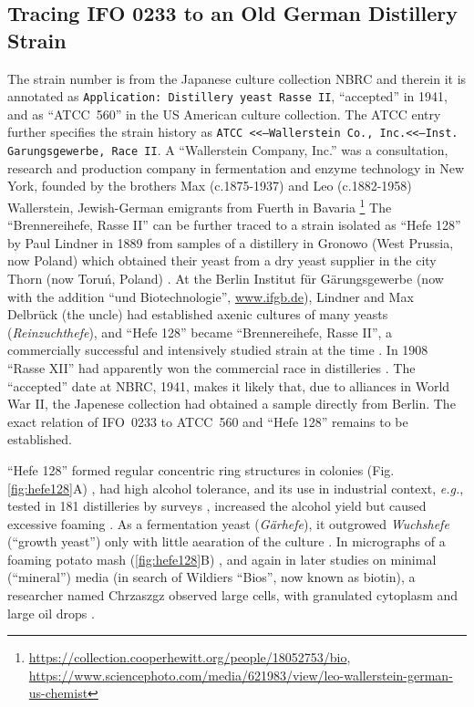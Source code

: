 \documentclass[11pt,a4paper,english]{article}
\newcommand{\ifo}{IFO~0233}
\newcommand{\eg}[0]{\textit{e.g.}}
\let\cite\citep
\begin{document}
\subsection{Tracing IFO 0233 to an Old German Distillery Strain}
The strain number is from the Japanese
culture collection NBRC and therein it is annotated as \texttt{Application:
  Distillery yeast Rasse II}, ``accepted'' in 1941, and as ``ATCC~560'' in
the US American culture collection. The ATCC entry further specifies
the strain history as \texttt{ATCC <<--Wallerstein Co.,
  Inc.<<--Inst. Garungsgewerbe, Race II}.  A ``Wallerstein Company,
Inc.''  was a consultation, research and production company in
fermentation and enzyme technology in New York, founded by the
brothers Max (c.1875-1937) and Leo (c.1882-1958) Wallerstein,
Jewish-German emigrants from Fuerth in
Bavaria \footnote{\url{https://collection.cooperhewitt.org/people/18052753/bio},\\ \url{https://www.sciencephoto.com/media/621983/view/leo-wallerstein-german-us-chemist}}
The ``Brennereihefe, Rasse II'' can be further traced to a strain
isolated as ``Hefe 128'' by Paul Lindner in 1889 from samples of a
distillery in Gronowo (West Prussia, now Poland) which obtained their
yeast from a dry yeast supplier in the city Thorn (now Toru\'n,
Poland) \cite{Lindner1895}. At the Berlin Institut f\"ur
G\"arungsgewerbe (now with the addition ``und Biotechnologie'',
\url{www.ifgb.de}), Lindner and Max Delbr\"uck (the uncle) had
established axenic cultures of many yeasts (\textit{Reinzuchthefe}),
and ``Hefe 128'' became ``Brennereihefe, Rasse II'', a commercially
successful and intensively studied strain at the time
\cite{Lindner1895, Lindner1919}. In 1908 ``Rasse XII'' had apparently
won the commercial race in distilleries \cite{Kohl1908}.  The
``accepted'' date at NBRC, 1941, makes it likely that, due to
alliances in World War II, the Japenese collection had obtained a
sample directly from Berlin. The exact relation of \ifo{} to ATCC~560
and ``Hefe 128'' remains to be established.

``Hefe 128'' formed regular concentric ring structures in colonies
(Fig. \ref{fig:hefe128}A) \cite{Lindner1895}, had high alcohol tolerance, and
its use in industrial context, \eg{}, tested in 181 distilleries by
surveys \cite{Dingler1894}, increased the alcohol yield but caused
excessive foaming \cite{Behrend1900}. As a fermentation yeast
(\textit{G\"arhefe}), it outgrowed \textit{Wuchshefe} (``growth
yeast'') only with little aearation of the culture \cite{Haehn1952}.
%
In micrographs of a foaming potato mash (\ref{fig:hefe128}B)
\cite{Lindner1903}, and again in later studies on minimal (``mineral'')
media (in search of Wildiers ``Bios'', now known as biotin), a
researcher named Chrzaszgz observed large cells, with granulated
cytoplasm and large oil drops \cite{Lindner1919}.
%
%
\end{document}
